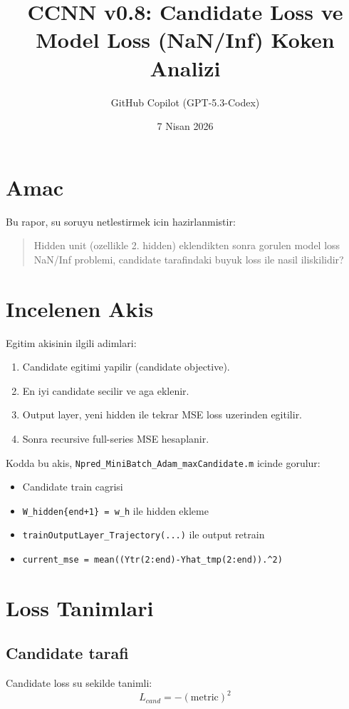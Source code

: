 \documentclass[12pt,a4paper]{article}
\title{CCNN v0.8: Candidate Loss ve Model Loss (NaN/Inf) Koken Analizi}
\author{GitHub Copilot (GPT-5.3-Codex)}
\date{7 Nisan 2026}
\begin{document}
\maketitle

\section{Amac}
Bu rapor, su soruyu netlestirmek icin hazirlanmistir:
\begin{quote}
Hidden unit (ozellikle 2. hidden) eklendikten sonra gorulen model loss NaN/Inf problemi,
candidate tarafindaki buyuk loss ile nasil iliskilidir?
\end{quote}

\section{Incelenen Akis}
Egitim akisinin ilgili adimlari:
\begin{enumerate}
    \item Candidate egitimi yapilir (candidate objective).
    \item En iyi candidate secilir ve aga eklenir.
    \item Output layer, yeni hidden ile tekrar MSE loss uzerinden egitilir.
    \item Sonra recursive full-series MSE hesaplanir.
\end{enumerate}

Kodda bu akis, \texttt{Npred\_MiniBatch\_Adam\_maxCandidate.m} icinde gorulur:
\begin{itemize}
    \item Candidate train cagrisi
    \item \texttt{W\_hidden\{end+1\} = w\_h} ile hidden ekleme
    \item \texttt{trainOutputLayer\_Trajectory(...)} ile output retrain
    \item \texttt{current\_mse = mean((Ytr(2:end)-Yhat\_tmp(2:end)).\^{}2)}
\end{itemize}

\section{Loss Tanimlari}
\subsection{Candidate tarafi}
Candidate loss su sekilde tanimli:
\begin{equation}
L_{cand} = -(\text{metric})^2
\end{equation}
\end{document}
